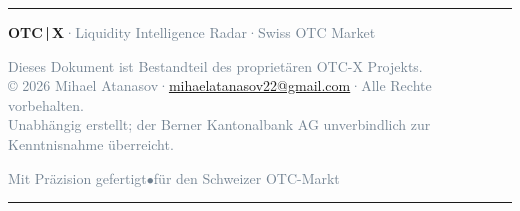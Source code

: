 \documentclass[11pt, a4paper, oneside, openany]{report}
\begin{document}
\begin{center}
{\color{SwissRed}\rule{0.5\textwidth}{1pt}}

\vspace{0.6cm}
{\sffamily\textcolor{DeepNavy}{\textbf{OTC\,|\,X}}\;\textcolor{SlateGrey}{·\;Liquidity Intelligence Radar\;·\;Swiss OTC Market}}

\vspace{0.3cm}
{\small\sffamily\textcolor{SlateGrey}{Dieses Dokument ist Bestandteil des proprietären OTC-X Projekts.}}\\[3pt]
{\small\sffamily\textcolor{SlateGrey}{\copyright{} 2026 Mihael Atanasov\;·\;\href{mailto:mihaelatanasov22@gmail.com}{mihaelatanasov22@gmail.com}\;·\;Alle Rechte vorbehalten.}}\\[3pt]
{\small\sffamily\textcolor{SlateGrey}{Unabhängig erstellt; der Berner Kantonalbank AG unverbindlich zur Kenntnisnahme überreicht.}}

\vspace{0.3cm}
{\footnotesize\sffamily\textcolor{SlateGrey}{Mit Präzision gefertigt\;\;$\bullet$\;\;für den Schweizer OTC-Markt}}

\vspace{0.5cm}
{\color{SwissRed}\rule{0.5\textwidth}{1pt}}
\end{center}
\end{document}

